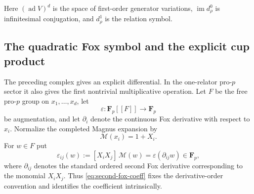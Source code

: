 \documentclass[11pt]{article}
\theoremstyle{definition}
\newcommand{\ad}{\operatorname{ad}}
\begin{document}
Here $(\ad V)^d$ is the space of first-order generator variations, $\operatorname{im}d^0_\rho$ is infinitesimal conjugation, and $d^1_\rho$ is the relation symbol.

\subsection{The quadratic Fox symbol and the explicit cup product}

The preceding complex gives an explicit differential.  In the one-relator pro-$p$ sector it also gives the first nontrivial multiplicative operation.  Let $F$ be the free pro-$p$ group on $x_1,\ldots,x_d$, let
\[
\varepsilon:\mathbf F_p[[F]]\longrightarrow\mathbf F_p
\]
be augmentation, and let $\partial_i$ denote the continuous Fox derivative with respect to $x_i$.  Normalize the completed Magnus expansion by
\[
\mathcal M(x_i)=1+X_i.
\]
For $w\in F$ put
\begin{equation}\label{eq:second-fox-coeff}
\varepsilon_{ij}(w)
:=
[X_iX_j]\,\mathcal M(w)
=
\varepsilon\!\left(\partial_{ij}w\right)
\in\mathbf F_p,
\end{equation}
where $\partial_{ij}$ denotes the standard ordered second Fox derivative corresponding to the monomial $X_iX_j$.  Thus \eqref{eq:second-fox-coeff} fixes the derivative-order convention and identifies the coefficient intrinsically.
\end{document}
